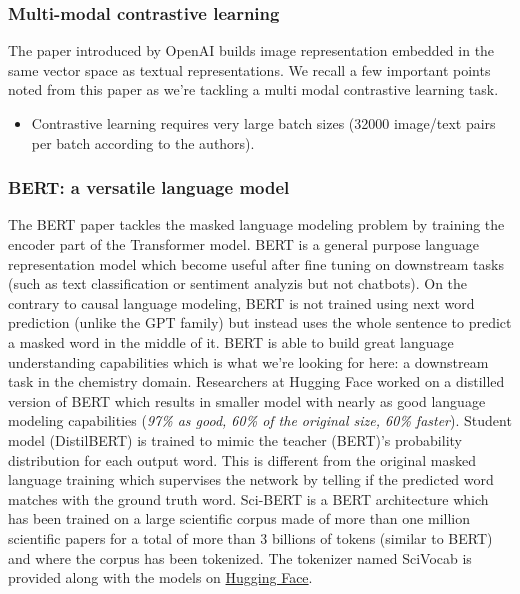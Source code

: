 
\subsubsection{Multi-modal contrastive learning}
\label{sec:clip}
The \cite{CLIP} paper introduced by OpenAI builds image representation embedded in the same vector space as textual representations. We recall a few important points noted from this paper as we're tackling a multi modal contrastive learning task. 
\begin{itemize}
    \item Contrastive learning requires very large batch sizes (32000 image/text pairs per batch according to the authors). 
\end{itemize}
\subsubsection{BERT: a versatile language model}
\label{sec:bert}
The BERT paper \cite{bert} tackles the masked language modeling problem by training the encoder part of the Transformer \cite{transformer} model. BERT is a general purpose language representation model which become useful after fine tuning on downstream tasks (such as text classification or sentiment analyzis but not chatbots).  On the contrary to causal language modeling, BERT is not trained using next word prediction (unlike the GPT family) but instead uses the whole sentence to predict a masked word in the middle of it. BERT is able to build great language understanding capabilities which is what we're looking for here: a downstream task in the chemistry domain.
Researchers at Hugging Face \cite{distilbert} worked on a distilled version of BERT which results in smaller model with nearly as good language modeling capabilities (\textit{97\% as good, 60\% of the original size, 60\% faster}). Student model (DistilBERT) is trained to mimic the teacher (BERT)'s probability distribution for each output word. This is different from the original masked language training which supervises the network by telling if the predicted word matches with the ground truth word.
Sci-BERT\cite{scibert} is a BERT architecture which has been trained on a large scientific corpus made of more than one million scientific papers for a total of more than 3 billions of tokens (similar to BERT) and where the corpus has been tokenized. The tokenizer named SciVocab is provided along with the models on \href{https://huggingface.co/allenai/scibert_scivocab_uncased}{Hugging Face}.

